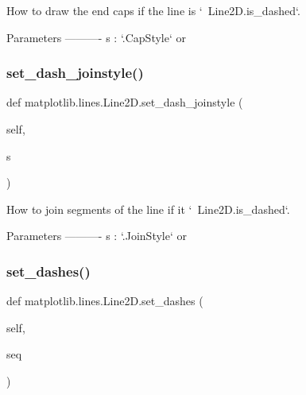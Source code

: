 \begin{DoxyVerb}How to draw the end caps if the line is `~Line2D.is_dashed`.

Parameters
----------
s : `.CapStyle` or %
\end{DoxyVerb}
 \mbox{\label{classmatplotlib_1_1lines_1_1Line2D_a6c7a751ba4ec95aa454b5199adabcac3}} 
\subsubsection{\texorpdfstring{set\+\_\+dash\+\_\+joinstyle()}{set\_dash\_joinstyle()}}
{\footnotesize\ttfamily def matplotlib.\+lines.\+Line2\+D.\+set\+\_\+dash\+\_\+joinstyle (\begin{DoxyParamCaption}\item[{}]{self,  }\item[{}]{s }\end{DoxyParamCaption})}

\begin{DoxyVerb}How to join segments of the line if it `~Line2D.is_dashed`.

Parameters
----------
s : `.JoinStyle` or %
\end{DoxyVerb}
 \mbox{\label{classmatplotlib_1_1lines_1_1Line2D_a7a35248e7061b61194409e50a381b7e1}} 
\subsubsection{\texorpdfstring{set\+\_\+dashes()}{set\_dashes()}}
{\footnotesize\ttfamily def matplotlib.\+lines.\+Line2\+D.\+set\+\_\+dashes (\begin{DoxyParamCaption}\item[{}]{self,  }\item[{}]{seq }\end{DoxyParamCaption})}

